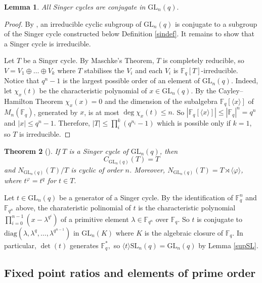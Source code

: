 \documentclass[a4paper,reqno,11pt]{amsart}
\newtheorem{Th}{Theorem}[section]
\newtheorem{Lem}[Th]{Lemma}
\theoremstyle{definition}
\theoremstyle{remark}
\numberwithin{equation}{section}
\newcommand{\diag}{\mathrm{diag}}
\newcommand{\SL}{{\mathrm{SL}}}
\newcommand{\GL}{{\mathrm{GL}}}
\begin{document}
\begin{Lem}\label{singconj} 
All Singer cycles are conjugate in $\GL_n(q).$ 
\end{Lem}
\begin{proof}
 By \cite[Satz 3.10]{hupp}, an irreducible cyclic subgroup of $\GL_n(q)$ is conjugate to a subgroup of the Singer cycle constructed below Definition \ref{sindef}. It remains to show that a Singer cycle is irreducible.

Let $T$ be a Singer cycle. By Maschke's Theorem, $T$ is completely reducible, so 
$V = V_1 \oplus \ldots \oplus V_k$ where $T$ stabilises the $V_i$ and each $V_i$ is $\mathbb{F}_q[T]$-irreducible.  Notice that $q^n-1$ is the largest possible order of an element of $\GL_n(q).$ Indeed,  let $\chi_x(t)$ be the characteristic polynomial of $x \in \GL_n(q)$. By the Cayley--Hamilton Theorem $\chi_x(x)=0$ and the dimension of the subalgebra $\mathbb{F}_q[\langle x \rangle]$ of $M_n(\mathbb{F}_q)$, generated by $x$, is at most 
$\deg \chi_x(t) \le n.$ So $|\mathbb{F}_q[\langle x \rangle]|\le|\mathbb{F}_q|^n=q^n$ and $|x|\le q^n-1.$ Therefore,  $|T| \le \prod_i^k (q^{n_i}-1)$ which is  possible only if $k=1$, so $T$ is irreducible. 
\end{proof} 

\begin{Th}[{\cite[Chapter II, \S 7]{hupp}}]\label{sin1} 
If $T$ is a Singer cycle of $\GL_n(q)$, then $$C_{\GL_n(q)}(T) = T$$
and $N_{\GL_n(q)} (T) /T$ is cyclic of order $n$. Moreover, $N_{\GL_n(q)} (T)=T \rtimes \langle \varphi \rangle$, where $t^{\varphi}=t^q$ for $t \in T.$ 
\end{Th}




Let $t \in \GL_n(q)$ be a generator of a Singer cycle. By the identification of $\mathbb{F}_q^n$ and $\mathbb{F}_{q^n}$ above, the charateristic polinomial of $t$ is the characteristic polynomial $\prod_{i=0}^{n-1}(x-\lambda^{q^i})$ of a primitive element $\lambda \in \mathbb{F}_{q^n}$ over $\mathbb{F}_q.$ So $t$ is conjugate to $\diag(\lambda, \lambda^q, \ldots, \lambda^{q^{n-1}})$ in $\GL_n(K)$ where $K$ is the algebraic closure of $\mathbb{F}_q.$ In particular, $\det(t)$ generates $\mathbb{F}_q^*,$ so $\langle t \rangle \SL_n(q)=\GL_n(q)$ by Lemma \ref{supSL}.

\subsection{Fixed point ratios and elements of prime order}
\label{fprsec}
\end{document}
